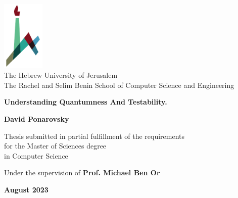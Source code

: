 \documentclass[11pt, oneside]{book}
\begin{document}

\begin{titlepage}
    \begin{center}
        \vspace*{1cm}
        
        \includegraphics[width=0.15\textwidth]{huji_logo_notext.pdf}\\
        The Hebrew University of Jerusalem\\
        The Rachel and Selim Benin School of Computer Science and Engineering
        
        \vspace{2cm}
        
        {\Large \textbf{Understanding Quantumness And Testability.}}
        
        \vspace{1cm}
        
        \vspace{1.5cm}
        
        \textbf{David Ponarovsky}
        
        \vspace{1cm}
        
        Thesis submitted in partial fulfillment of the requirements\\for the Master of Sciences degree\\
        in Computer Science
        
        \vspace{1cm}
        
        Under the supervision of \textbf{Prof. Michael Ben Or}
        
        \vfill
        
        \textbf{August 2023}
    \end{center}
\end{titlepage}



%

\tableofcontents
\listoffigures
\setlength{\parindent}{0pt}
\setlength{\parskip}{5pt}
% 








\printbibliography[heading=bibliography]
\end{document}
